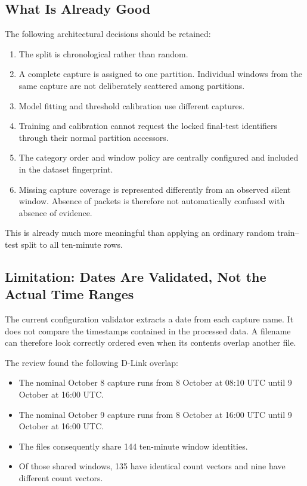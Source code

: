 \documentclass[11pt,a4paper]{article}
\begin{document}
\subsection{What Is Already Good}

The following architectural decisions should be retained:

\begin{enumerate}

\item The split is chronological rather than random.

\item A complete capture is assigned to one partition. Individual windows from
the same capture are not deliberately scattered among partitions.

\item Model fitting and threshold calibration use different captures.

\item Training and calibration cannot request the locked final-test identifiers
through their normal partition accessors.

\item The category order and window policy are centrally configured and
included in the dataset fingerprint.

\item Missing capture coverage is represented differently from an observed
silent window. Absence of packets is therefore not automatically confused with
absence of evidence.

\end{enumerate}

This is already much more meaningful than applying an ordinary random
train--test split to all ten-minute rows.

\subsection{Limitation: Dates Are Validated, Not the Actual Time Ranges}

The current configuration validator extracts a date from each capture name. It
does not compare the timestamps contained in the processed data. A filename can
therefore look correctly ordered even when its contents overlap another file.

The review found the following D-Link overlap:

\begin{itemize}

\item The nominal October 8 capture runs from 8 October at 08:10 UTC until
9 October at 16:00 UTC.

\item The nominal October 9 capture runs from 8 October at 16:00 UTC until
9 October at 16:00 UTC.

\item The files consequently share 144 ten-minute window identities.

\item Of those shared windows, 135 have identical count vectors and nine have
different count vectors.

\end{itemize}
\end{document}
